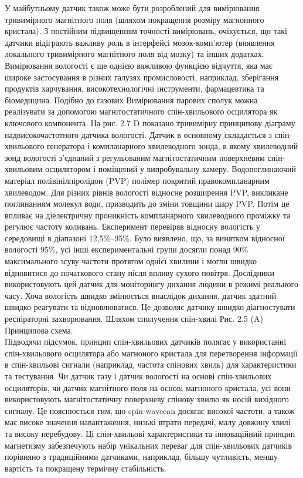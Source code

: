 \documentclass[a4paper,14pt]{extreport}
\begin{document}
У майбутньому датчик також може бути розроблений для вимірювання тривимірного магнітного поля (шляхом покращення розміру магнонного кристала). З постійним підвищенням точності вимірювань, очікується, що такі датчики відіграють важливу роль в інтерфейсі мозок-комп’ютер (виявлення локального тривимірного магнітного поля від мозку) та інших додатках. Вимірювання вологості є ще однією важливою функцією відчуття, яка має широке застосування в різних галузях промисловості, наприклад, зберігання продуктів харчування, високотехнологічні інструменти, фармацевтика та біомедицина. Подібно до газових Вимірювання парових сполук можна реалізувати за допомогою магнітостатичного спін-хвильового осцилятора як ключового компонента. На рис. 2.7 D показано тривимірну принципову діаграму надвисокочастотного датчика вологості. Датчик в основному складається з спін-хвильового генератора і компланарного хвилеводного зонда, в якому хвилеводний зонд вологості з'єднаний з регульованим магнітостатичним поверхневим спін-хвильовим осцилятором і поміщений у випробувальну камеру. Водопоглинаючий матеріал полівінілпіролідон (PVP) полімер покритий правокомпланарним хвилеводом. Для різних рівнів вологості відносне розширення PVP, викликане поглинанням молекул води, призводить до зміни товщини шару PVP. Потім це впливає на діелектричну проникність компланарного хвилеводного проміжку та регулює частоту коливань. Експеримент перевіряв відносну вологість у середовищі в діапазоні 12,5\%–95\%. Було виявлено, що, за винятком відносної вологості 95\%, усі інші експериментальні групи досягли понад 90\% максимального зсуву частоти протягом однієї хвилини і могли швидко відновитися до початкового стану після впливу сухого повітря. Дослідники використовують цей датчик для моніторингу дихання людини в режимі реального часу. Хоча вологість швидко змінюється внаслідок дихання, датчик здатний швидко реагувати та відновлюватися. Це дозволяє датчику швидко діагностувати респіраторні захворювання. Шляхом сполучення спін-хвилі Рис. 2.5 (A) Принципова схема.\\ 

Підводячи підсумок, принцип спін-хвильових датчиків полягає у використанні спін-хвильового осцилятора або магноного кристала для перетворення інформації в спін-хвильові сигнали (наприклад, частота спінових хвиль) для характеристики та тестування. Чи датчик газу  і датчик вологості на основі спін-хвильових осциляторів, чи датчик магнітного поля на основі магноного кристала, усі вони використовують магнітостатичну поверхневу спінову хвилю як носій вихідного сигналу. Це пояснюється тим, що spin-wavecan досягає високої частоти, а також має високе значення навантаження, низькі втрати передачі, малу довжину хвилі та високу перебудову. Ці спін-хвильові характеристики та інноваційний принцип магнетизму забезпечують набір унікальних переваг для спін-хвильових датчиків порівняно з традиційними датчиками, наприклад, більшу чутливість, меншу вартість та покращену термічну стабільність.
\end{document}
